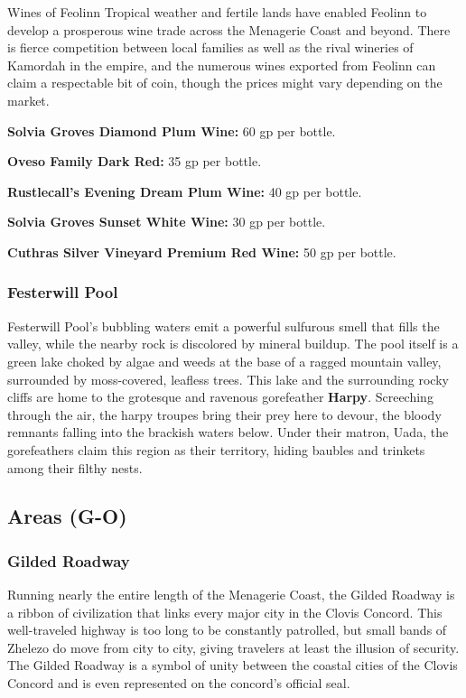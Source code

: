 \documentclass[10pt,a4paper,twoside,bg=print,twocolumn,openany,nodeprecatedcode]{dndbook}
\begin{document}
\begin{DndSidebar}[float=!b]{Wines of Feolinn}
Tropical weather and fertile lands have enabled Feolinn to develop a prosperous wine trade across the Menagerie Coast and beyond. There is fierce competition between local families as well as the rival wineries of Kamordah in the empire, and the numerous wines exported from Feolinn can claim a respectable bit of coin, though the prices might vary depending on the market.



\textbf{Solvia Groves Diamond Plum Wine:} 60 gp per bottle.



\textbf{Oveso Family Dark Red:} 35 gp per bottle.



\textbf{Rustlecall's Evening Dream Plum Wine:} 40 gp per bottle.



\textbf{Solvia Groves Sunset White Wine:} 30 gp per bottle.



\textbf{Cuthras Silver Vineyard Premium Red Wine:} 50 gp per bottle.



\end{DndSidebar}

\subsubsection{Festerwill Pool}
Festerwill Pool's bubbling waters emit a powerful sulfurous smell that fills the valley, while the nearby rock is discolored by mineral buildup. The pool itself is a green lake choked by algae and weeds at the base of a ragged mountain valley, surrounded by moss-covered, leafless trees. This lake and the surrounding rocky cliffs are home to the grotesque and ravenous gorefeather \textbf{Harpy}. Screeching through the air, the harpy troupes bring their prey here to devour, the bloody remnants falling into the brackish waters below. Under their matron, Uada, the gorefeathers claim this region as their territory, hiding baubles and trinkets among their filthy nests.

\subsection{Areas (G-O)}
\subsubsection{Gilded Roadway}
Running nearly the entire length of the Menagerie Coast, the Gilded Roadway is a ribbon of civilization that links every major city in the Clovis Concord. This well-traveled highway is too long to be constantly patrolled, but small bands of Zhelezo do move from city to city, giving travelers at least the illusion of security. The Gilded Roadway is a symbol of unity between the coastal cities of the Clovis Concord and is even represented on the concord's official seal.
\end{document}
